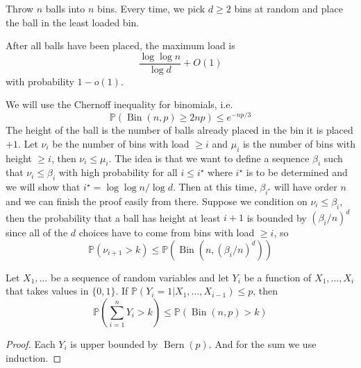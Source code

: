 Throw $n$ balls into $n$ bins.
Every time, we pick $d\ge 2$ bins at random and place the ball in the least loaded bin.
\begin{theorem}
    After all balls have been placed, the maximum load is
    $$\frac{\log\log n}{\log d}+O(1)$$
    with probability $1-o(1)$.
\end{theorem}
We will use the Chernoff inequality for binomials, i.e.
$$\mathbb P(\operatorname{Bin}(n,p)\ge 2np)\le e^{-np/3}$$
The height of the ball is the number of balls already placed in the bin it is placed $+1$.
Let $\nu_i$ be the number of bins with load $\ge i$ and $\mu_i$ is the number of bins with height $\ge i$, then $\nu_i\le \mu_i$.
The idea is that we want to define a sequence $\beta_i$ such that $\nu_i\le\beta_i$ with high probability for all $i\le i^\star$ where $i^\star$ is to be determined and we will show that $i^\star=\log\log n/\log d$.
Then at this time, $\beta_{i^\star}$ will have order $n$ and we can finish the proof easily from there.
Suppose we condition on $\nu_i\le\beta_i$, then the probability that a ball has height at least $i+1$ is bounded by $(\beta_i/n)^d$ since all of the $d$ choices have to come from bins with load $\ge i$, so
$$\mathbb P(\nu_{i+1}>k)\le\mathbb P(\operatorname{Bin}(n,(\beta_i/n)^d))$$
\begin{lemma}
    Let $X_1,\ldots$ be a sequence of random variables and let $Y_i$ be a function of $X_1,\ldots,X_i$ that takes values in $\{0,1\}$.
    If $\mathbb P(Y_i=1|X_1,\ldots,X_{i-1})\le p$, then
    $$\mathbb P\left( \sum_{i=1}^nY_i>k \right)\le\mathbb P(\operatorname{Bin}(n,p)>k)$$
\end{lemma}
\begin{proof}
    Each $Y_i$ is upper bounded by $\operatorname{Bern}(p)$.
    And for the sum we use induction.
\end{proof}
